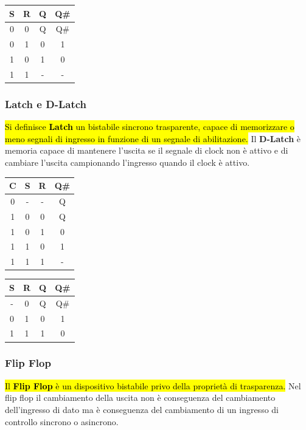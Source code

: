 \documentclass{article}
\begin{document}
\begin{center}
\begin{tabular}{c | c || c | c} 
 S & R & Q & Q\# \\
 \hline
 0 & 0 & Q & Q\# \\
 0 & 1 & 0 & 1   \\
 1 & 0 & 1 & 0   \\
 1 & 1 & - & -   \\
\end{tabular}
\end{center}

\subsubsection{Latch e D-Latch}
\hl{Si definisce \textbf{Latch} un bistabile sincrono trasparente, capace di memorizzare o meno segnali di ingresso in funzione di un segnale di abilitazione.}
Il \textbf{D-Latch} è memoria capace di mantenere l’uscita se il segnale di clock non è attivo e di cambiare l’uscita campionando l’ingresso quando il clock è attivo.

\begin{center}
\begin{tabular}{c | c | c || c}
 C & S & R & Q\# \\
 \hline
 0 & - & - & Q \\
 1 & 0 & 0 & Q \\
 1 & 0 & 1 & 0 \\
 1 & 1 & 0 & 1 \\
 1 & 1 & 1 & - \\
\end{tabular}
\quad
\begin{tabular}{c | c || c | c}
 S & R & Q & Q\# \\
 \hline
 - & 0 & Q & Q\# \\
 0 & 1 & 0 & 1   \\
 1 & 1 & 1 & 0   \\
\end{tabular}
\end{center}

\subsubsection{Flip Flop}
\hl{Il \textbf{Flip Flop} è un dispositivo bistabile privo della proprietà di trasparenza.}
Nel flip flop il cambiamento della uscita non è conseguenza del cambiamento dell’ingresso di dato ma è conseguenza del cambiamento di un ingresso di controllo sincrono o asincrono.
\end{document}
